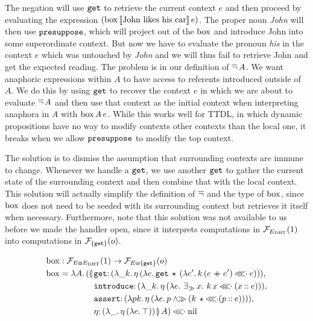 The negation will use $\mathtt{get}$ to retrieve the current context $e$ and
then proceed by evaluating the expression
$(\mathrm{box}\,\llbracket \text{John likes his car} \rrbracket\,e)$. The proper noun
\emph{John} will then use $\mathtt{presuppose}$, which will project out of the
$\mathrm{box}$ and introduce John into some superordinate context. But now we have
to evaluate the pronoun \emph{his} in the context $e$ which was untouched
by \emph{John} and we will thus fail to retrieve John and get the expected
reading. The problem is in our definition of $\mathop{\overline{\lnot}} A$. We want anaphoric
expressions within $A$ to have access to referents introduced outside of
$A$. We do this by using $\mathtt{get}$ to recover the context $e$ in which we
are about to evaluate $\mathop{\overline{\lnot}} A$ and then use that context as the initial
context when interpreting anaphora in $A$ with $\mathrm{box}\,A\,e$. While
this works well for TTDL, in which dynamic propositions have no way to
modify contexts other contexts than the local one, it breaks when we allow
$\mathtt{presuppose}$ to modify the top context.

The solution is to dismiss the assumption that surrounding contexts are
immune to change. Whenever we handle a $\mathtt{get}$, we use another
$\mathtt{get}$ to gather the current state of the surrounding context and then
combine that with the local context. This solution will actually simplify
the definition of $\mathop{\overline{\lnot}}$ and the type of $\mathrm{box}$, since $\mathrm{box}$ does not
need to be seeded with its surrounding context but retrieves it itself when
necessary. Furthermore, note that this solution was not available to us
before we made the handler open, since it interprets computations in
$\mathcal{F}_{E_{\mathrm{DRT}}}(1)$ into computations in $\mathcal{F}_{\{\mathtt{get}\}}(o)$.

\begin{align*}
  &\BOX :\FF_{E \uplus E_\DRT}(1) \to \FF_{E \uplus \{\op{get}\}}(o) \\
  &\BOX = \lam{A}{(\ap{\begin{aligned}[t]\lban
  &\onto{\op{get}}{(\lam{\_ k}{\etaE{(\lam{e}{\app{\op{get}}{\star}{(\lam{e'}{\ap{k}{(e \cat e')} \apll e})}})}})}, \\
  &\onto{\op{introduce}}{(\lam{\_ k}{\etaE{(\lam{e}{\existsr x.\ \ap{k}{x} \apll (x \cons e)})}})}, \\
  &\onto{\op{assert}}{(\lam{p k}{\etaE{(\lam{e}{p \andr (\ap{k}{\star} \apll (p \cons e))})}})}, \\
  &\onto{\eta}{(\lam{\_}{\etaE{(\lam{e}{\top})}})}\rban}{A}) \apll \nil
    \end{aligned}}
\end{align*}

